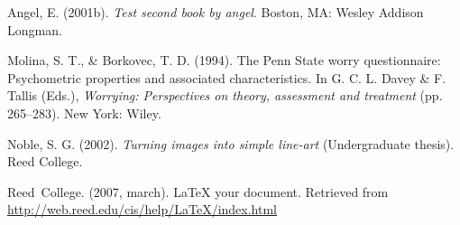 \documentclass[12pt,twoside]{reedthesis}
\begin{document}
  \hypertarget{ref-angel2002a}{}
  Angel, E. (2001b). \emph{Test second book by angel}. Boston, MA: Wesley
  Addison Longman.
  
  \hypertarget{ref-Molina1994}{}
  Molina, S. T., \& Borkovec, T. D. (1994). The Penn State worry
  questionnaire: Psychometric properties and associated characteristics.
  In G. C. L. Davey \& F. Tallis (Eds.), \emph{Worrying: Perspectives on
  theory, assessment and treatment} (pp. 265--283). New York: Wiley.
  
  \hypertarget{ref-noble2002}{}
  Noble, S. G. (2002). \emph{Turning images into simple line-art}
  (Undergraduate thesis). Reed College.
  
  \hypertarget{ref-reedweb2007}{}
  Reed~College. (2007, march). LaTeX your document. Retrieved from
  \url{http://web.reed.edu/cis/help/LaTeX/index.html}


\end{document}
